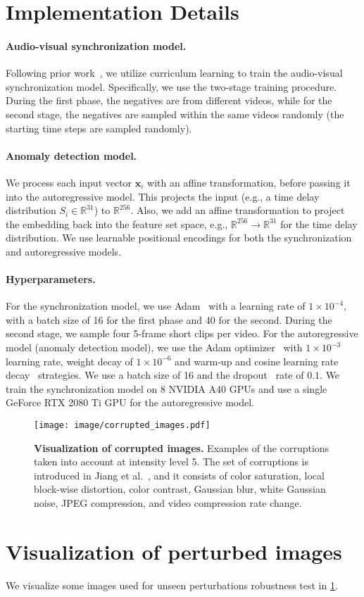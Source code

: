 \documentclass[10pt,twocolumn,letterpaper]{article}
\newcommand{\bx}[0]{{\mathbf x}}
\newcommand{\mypar}[1]{\vspace{-3mm}\paragraph{#1}}
\begin{document}
\section{Implementation Details}
\label{appendix:imple}
\paragraph{Audio-visual synchronization model.}
Following prior work~\cite{Afouras20b,chen2021audio,korbar2018cooperative}, we utilize curriculum learning to train the audio-visual synchronization model. Specifically, we use the two-stage training procedure. During the first phase, the negatives are from different videos, while for the second stage, the negatives are sampled within the same videos randomly (the starting time steps are sampled randomly). 


\mypar{Anomaly detection model.}
We process each input vector $\bx_i$ with an affine transformation, before passing it into the autoregressive model. This projects the input (e.g., a time delay distribution $S_i \in \mathbb{R}^{31}$) to $\mathbb{R}^{256}$. Also, we add an affine transformation to project the embedding back into the feature set space, e.g., $\mathbb{R}^{256} \rightarrow  \mathbb{R}^{31}$ for the time delay distribution. We use learnable positional encodings for both the synchronization and autoregressive models. 



\mypar{Hyperparameters.}
For the synchronization model, we use Adam~\cite{kingma2014adam} with a learning rate of  $1\times10^{-4}$, with a batch size of 16 for the first phase and 40 for the second. During the second stage, we sample four 5-frame short clips per video. For the autoregressive model (anomaly detection model), we use the Adam optimizer~\cite{kingma2014adam} with $1\times10^{-3}$ learning rate, weight decay of $1\times10^{-6}$ and warm-up and cosine learning rate decay~\cite{loshchilov2016sgdr} strategies. We use a batch size of 16 and the dropout~\cite{srivastava2014dropout} rate of $0.1$. We train the synchronization model on 8 NVIDIA A40 GPUs and use a single GeForce RTX 2080 Ti GPU for the autoregressive model.

\begin{figure}[t!]
    \centering
    \texttt{[image: image/corrupted\_images.pdf]}
    \caption{\textbf{Visualization of corrupted images.} Examples of the corruptions taken into account at intensity level 5. The set of corruptions is introduced in Jiang et al.~\cite{jiang2020deeperforensics}, and it consists of color saturation, local block-wise distortion, color contrast, Gaussian blur, white Gaussian noise, JPEG compression, and video compression rate change.}
    \label{corrupted_images}
\end{figure} \section{Visualization of perturbed images}
We visualize some images used for unseen perturbations robustness test in \cref{corrupted_images}. 
\end{document}
